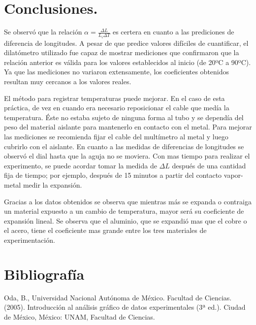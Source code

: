 \documentclass[a4paper]{article}
\begin{document}
\section*{Conclusiones.}
Se observó que la relación $\alpha = \frac{\Delta L}{L_i \Delta T}$ es certera en cuanto a las prediciones de diferencia de longitudes. A pesar de que predice valores difíciles de cuantificar, el dilatómetro utilizado fue capaz de mostrar mediciones que confirmaron que la relación anterior es válida para los valores establecidos al inicio (de 20ºC a 90ºC). Ya que las mediciones no variaron extensamente, los coeficientes obtenidos resultan  muy cercanos a los valores reales. 

El método para registrar temperaturas puede mejorar. En el caso de esta práctica, de vez en cuando era necesario reposicionar el cable que medía la temperatura. Éste no estaba sujeto de ninguna forma al tubo y se dependía del peso del material aislante para mantenerlo en contacto con el metal. Para mejorar las mediciones se recomienda fijar el cable del multímetro al metal y luego cubrirlo con el aislante. En cuanto a las medidas de diferencias de longitudes se observó el dial hasta que la aguja no se moviera. Con mas tiempo para realizar el experimento, se puede acordar tomar la medida de $\Delta L$ después de una cantidad fija de tiempo; por ejemplo, después de 15 minutos a partir del contacto vapor-metal medir la expansión.

Gracias a los datos obtenidos se observa que mientras más se expanda o  contraiga un material expuesto a un cambio de temperatura, mayor será su coeficiente de expansión lineal. Se observa que el aluminio, que se expandió mas que el cobre o el acero, tiene el coeficiente mas grande entre los tres materiales de experimentación. 




\section*{Bibliografía}
Oda, B.,  Universidad Nacional Autónoma de México. Facultad de Ciencias. (2005). Introducción al análisis gráfico de datos experimentales (3ª ed.). Ciudad de México, México: UNAM, Facultad de Ciencias.
\end{document}
